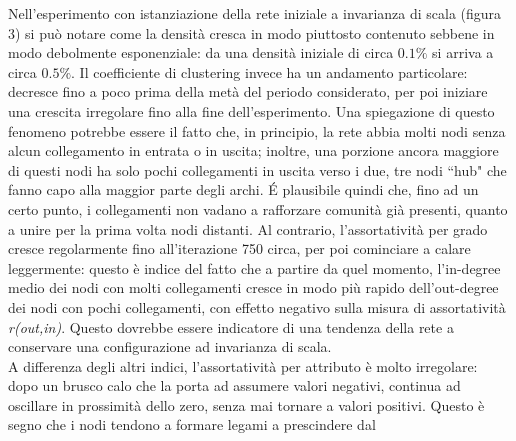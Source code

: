 \documentclass[a4paper,12pt]{article}
\begin{document}
Nell'esperimento con istanziazione della rete iniziale a invarianza di scala (figura 3) si può notare come la densità cresca in modo piuttosto contenuto sebbene in modo debolmente esponenziale: da una densità iniziale di circa $0.1\%$ si arriva a circa $0.5\%$. Il coefficiente di clustering invece ha un andamento particolare: decresce fino a poco prima della metà del periodo considerato, per poi iniziare una crescita irregolare fino alla fine dell'esperimento. Una spiegazione di questo fenomeno potrebbe essere il fatto che, in principio, la rete abbia molti nodi senza alcun collegamento in entrata o in uscita; inoltre, una porzione ancora maggiore di questi nodi ha solo pochi collegamenti in uscita verso i due, tre nodi ``hub" che fanno capo alla maggior parte degli archi. \'E plausibile quindi che, fino ad un certo punto, i collegamenti non vadano a rafforzare comunità già presenti, quanto a unire per la prima volta nodi distanti.
Al contrario, l'assortatività per grado cresce regolarmente fino all'iterazione 750 circa, per poi cominciare a calare leggermente: questo è indice del fatto che a partire da quel momento, l'in-degree medio dei nodi con molti collegamenti cresce in modo più rapido dell'out-degree dei nodi con pochi collegamenti, con effetto negativo sulla misura di assortatività \textit{r(out,in)}. Questo dovrebbe essere indicatore di una tendenza della rete a conservare una configurazione ad invarianza di scala.\\
A differenza degli altri indici, l'assortatività per attributo è molto irregolare: dopo un brusco calo che la porta ad assumere valori negativi, continua ad oscillare in prossimità dello zero, senza mai tornare a valori positivi. Questo è segno che i nodi tendono a formare legami a prescindere dal 
\end{document}
